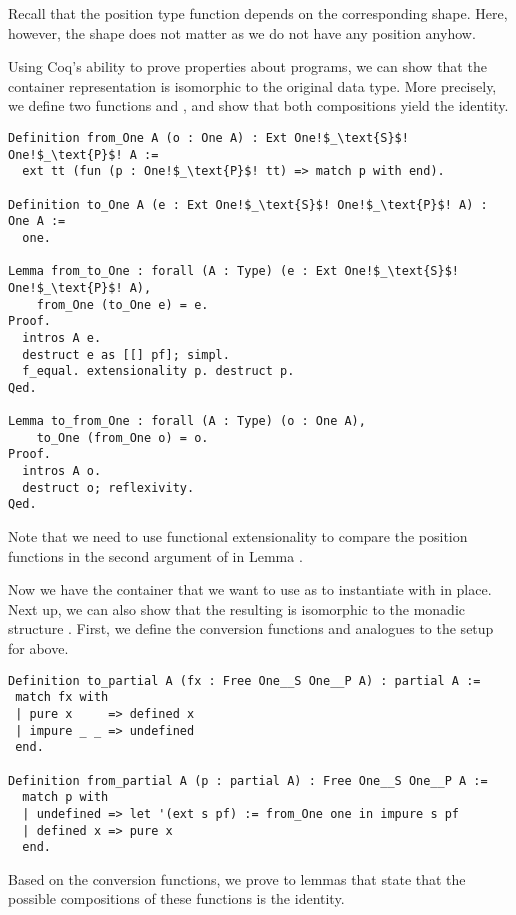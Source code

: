 Recall that the position type function depends on the corresponding
shape.
Here, however, the shape does not matter as we do not have any
position anyhow.

Using Coq's ability to prove properties about programs, we can show
that the container representation is isomorphic to the original data
type.
More precisely, we define two functions  and
, and show that both compositions yield the
identity.

\begin{verbatim}
Definition from_One A (o : One A) : Ext One!$_\text{S}$! One!$_\text{P}$! A :=
  ext tt (fun (p : One!$_\text{P}$! tt) => match p with end).

Definition to_One A (e : Ext One!$_\text{S}$! One!$_\text{P}$! A) : One A :=
  one.

Lemma from_to_One : forall (A : Type) (e : Ext One!$_\text{S}$! One!$_\text{P}$! A),
    from_One (to_One e) = e.
Proof.
  intros A e.
  destruct e as [[] pf]; simpl.
  f_equal. extensionality p. destruct p.
Qed.

Lemma to_from_One : forall (A : Type) (o : One A),
    to_One (from_One o) = o.
Proof.
  intros A o.
  destruct o; reflexivity.
Qed.\end{verbatim}

Note that we need to use functional extensionality to compare the
position functions in the second argument of  in Lemma
.

Now we have the container that we want to use as to instantiate
 with in place.
Next up, we can also show that the resulting 
is isomorphic to the monadic structure .
First, we define the conversion functions  and
 analogues to the setup for  above.

\begin{verbatim}
Definition to_partial A (fx : Free One__S One__P A) : partial A :=
 match fx with
 | pure x     => defined x
 | impure _ _ => undefined
 end.

Definition from_partial A (p : partial A) : Free One__S One__P A :=
  match p with
  | undefined => let '(ext s pf) := from_One one in impure s pf
  | defined x => pure x
  end.
\end{verbatim}

Based on the conversion functions, we prove to lemmas that state that
the possible compositions of these functions is the identity.

